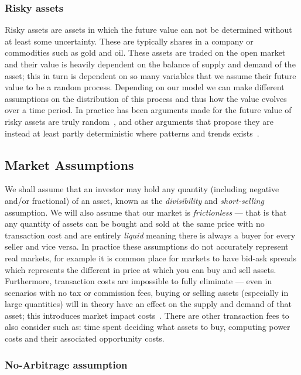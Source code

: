 \subsubsection{Risky assets}

Risky assets are assets in which the future value can not be determined without at least some uncertainty. These are typically shares in a company or commodities such as gold and oil. These assets are traded on the open market and their value is heavily dependent on the balance of supply and demand of the asset; this in turn is dependent on so many variables that we assume their future value to be a random process. Depending on our model we can make different assumptions on the distribution of this process and thus how the value evolves over a time period. In practice has been arguments made for the future value of risky assets are truly random~\cite{RandomWalkFama}, and other arguments that propose they are instead at least partly deterministic where patterns and trends exists~\cite{shiller}.

\subsection{Market Assumptions}

We shall assume that an investor may hold any quantity (including negative and/or fractional) of an asset, known as the \textit{divisibility} and \textit{short-selling} assumption. We will also assume that our market is \textit{frictionless} --- that is that any quantity of assets can be bought and sold at the same price with no transaction cost and are entirely \textit{liquid} meaning there is always a buyer for every seller and vice versa.
\nline{}
In practice these assumptions do not accurately represent real markets, for example it is common place for markets to have bid-ask spreads which represents the different in price at which you can buy and sell assets. Furthermore, transaction costs are impossible to fully eliminate --- even in scenarios with no tax or commission fees, buying or selling assets (especially in large quantities) will in theory have an effect on the supply and demand of that asset; this introduces market impact costs~\cite{moro2009market}. There are other transaction fees to also consider such as: time spent deciding what assets to buy, computing power costs and their associated opportunity costs.

\subsubsection{No-Arbitrage assumption}\label{subsubsec: No Arb}

